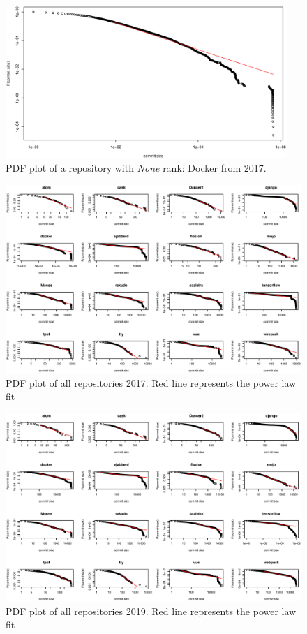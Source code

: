 \documentclass[conference]{IEEEtran}
\begin{document}
\begin{figure}[htbp]
	\centerline{\includegraphics[width=0.95\textwidth]{plots/docker.eps}}
	\caption{PDF plot of a repository with \textit{None} rank: Docker from 2017.}
	\label{fig:docker}
\end{figure}



\begin{figure}[htbp]
	\centerline{\includegraphics[width=1\textwidth]{plots/pl2017.eps}}
	\caption{PDF plot of all repositories 2017. Red line represents the power law fit}
	\label{fig:pl2017}
\end{figure}



\begin{figure}[htbp]
	\centerline{\includegraphics[width=1\textwidth]{plots/pl2019.eps}}
	\caption{PDF plot of all repositories 2019. Red line represents the power law fit}
	\label{fig:pl2019}
\end{figure}
\end{document}
